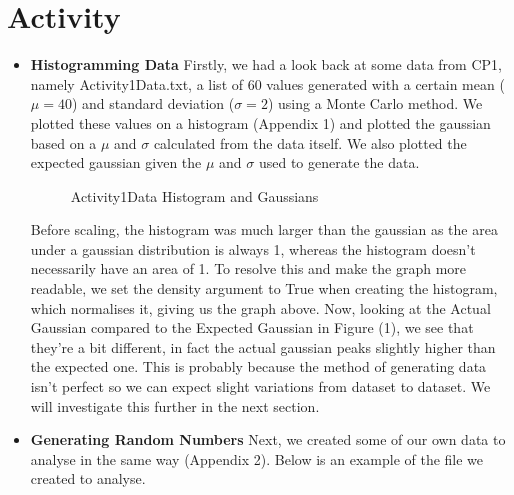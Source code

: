 \documentclass[12pt]{article}
\begin{document}
    \section{Activity}
    \begin{itemize}
        \item \textbf{Histogramming Data}\newline
        Firstly, we had a look back at some data from CP1, namely Activity1Data.txt, a list 
        of 60 values generated with a certain mean ($\mu=40$) and standard deviation ($\sigma=2$) 
        using a Monte Carlo method. We plotted these values on a histogram (Appendix 1) and plotted 
        the gaussian based on a $\mu$ and $\sigma$ calculated from the data itself. We also plotted 
        the expected gaussian given the $\mu$ and $\sigma$ used to generate the data. 
        
        \begin{figure}[H]
            \begin{center}
                \scalebox{.7}{}
                \caption{Activity1Data Histogram and Gaussians}
                \label{fig:Activity1DataHist}
            \end{center}
        \end{figure}
        
        \noindent
        Before scaling, the histogram was much larger than the gaussian as the area under a gaussian 
        distribution is always 1, whereas the histogram doesn't necessarily have an area of 1. To 
        resolve this and make the graph more readable, we set the density argument to True when 
        creating the histogram, which normalises it, giving us the graph above. 
        \newline
        Now, looking at the Actual Gaussian compared to the Expected Gaussian in Figure 
        (1), we see that they're a bit different, in fact the actual 
        gaussian peaks slightly higher than the expected one. This is probably because the method 
        of generating data isn't perfect so we can expect slight variations from dataset to dataset. 
        We will investigate this further in the next section.

        \item \textbf{Generating Random Numbers}\newline
        Next, we created some of our own data to analyse in the same way (Appendix 2). Below is an 
        example of the file we created to analyse.
        \newline
        
        

\end{itemize}
\end{document}
